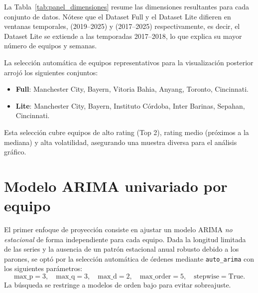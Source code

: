 La Tabla~\ref{tab:panel_dimensiones} resume las dimensiones resultantes para cada conjunto de datos. N\'otese que el Dataset Full y el Dataset Lite difieren en ventanas temporales, (2019--2025) y (2017--2025) respectivamente, es decir, el Dataset Lite se extiende a las temporadas 2017--2018, lo que explica su mayor n\'umero de equipos y semanas.

\begin{table}[htbp]
	\centering
	\caption{Dimensiones del panel semanal por conjunto de datos.}
	\label{tab:panel_dimensiones}
\end{table}

La selecci\'on autom\'atica de equipos representativos para la visualizaci\'on posterior arroj\'o los siguientes conjuntos:
\begin{itemize}
	\item \textbf{Full}: Manchester City, Bayern, Vitoria Bahia, Anyang, Toronto, Cincinnati.
	\item \textbf{Lite}: Manchester City, Bayern, Instituto C\'ordoba, Inter Barinas, Sepahan, Cincinnati.
\end{itemize}

Esta selecci\'on cubre equipos de alto rating (Top 2), rating medio (pr\'oximos a la mediana) y alta volatilidad, asegurando una muestra diversa para el an\'alisis gr\'afico.

\section{Modelo ARIMA univariado por equipo}
\label{ap:arima_univariado}

El primer enfoque de proyecci\'on consiste en ajustar un modelo ARIMA \textit{no estacional} de forma independiente para cada equipo. Dada la longitud limitada de las series y la ausencia de un patr\'on estacional anual robusto debido a los parones, se opt\'o por la selecci\'on autom\'atica de \'ordenes mediante \texttt{auto\_arima} con los siguientes par\'ametros:
\[
\text{max\_p} = 3,\quad \text{max\_q} = 3,\quad \text{max\_d} = 2,\quad \text{max\_order} = 5,\quad \text{stepwise} = \text{True}.
\]
La b\'usqueda se restringe a modelos de orden bajo para evitar sobreajuste.

